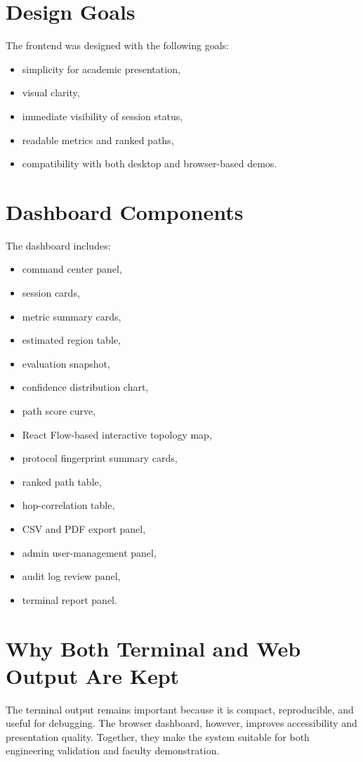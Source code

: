 \documentclass[12pt,a4paper]{report}
\begin{document}
\section{Design Goals}
The frontend was designed with the following goals:
\begin{itemize}[leftmargin=1.5em]
    \item simplicity for academic presentation,
    \item visual clarity,
    \item immediate visibility of session status,
    \item readable metrics and ranked paths,
    \item compatibility with both desktop and browser-based demos.
\end{itemize}

\section{Dashboard Components}
The dashboard includes:
\begin{itemize}[leftmargin=1.5em]
    \item command center panel,
    \item session cards,
    \item metric summary cards,
    \item estimated region table,
    \item evaluation snapshot,
    \item confidence distribution chart,
    \item path score curve,
    \item React Flow-based interactive topology map,
    \item protocol fingerprint summary cards,
    \item ranked path table,
    \item hop-correlation table,
    \item CSV and PDF export panel,
    \item admin user-management panel,
    \item audit log review panel,
    \item terminal report panel.
\end{itemize}

\section{Why Both Terminal and Web Output Are Kept}
The terminal output remains important because it is compact, reproducible, and useful for debugging. The browser dashboard, however, improves accessibility and presentation quality. Together, they make the system suitable for both engineering validation and faculty demonstration.
\end{document}
